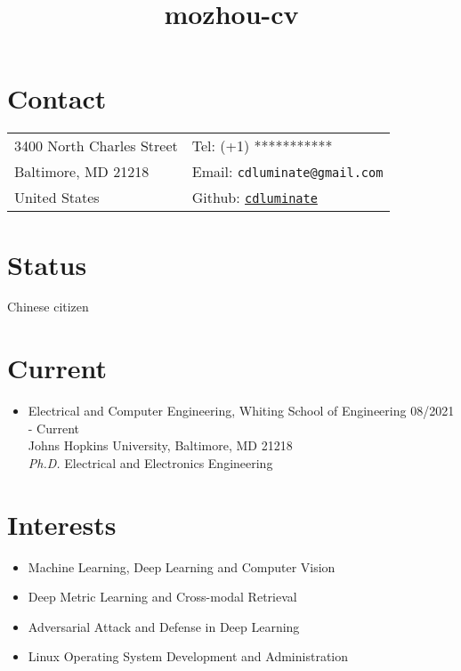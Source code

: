 \documentclass[10pt,margin,line,pifont,palatino,courier]{res}
\begin{document}
\title{mozhou-cv}
\begin{resume}

\section{\sc Contact}

\vspace{.05in}
\begin{tabular}{@{}p{2.2in}p{2.2in}}
3400 North Charles Street & Tel: (+1) *********** \\
Baltimore, MD 21218       & Email: \verb+cdluminate@gmail.com+\\
United States	          & Github: \href{https://github.com/cdluminate}{\tt cdluminate}
\end{tabular}

\section{\sc Status}
Chinese citizen

\section{\sc Current}

\begin{itemize}[leftmargin=*]
\item Electrical and Computer Engineering, Whiting School of Engineering
	\hfill 08/2021 - Current\\
	Johns Hopkins University, Baltimore, MD 21218\\
	\textit{Ph.D.} Electrical and Electronics Engineering
\end{itemize}

\section{\sc Interests}
\begin{itemize}[noitemsep, leftmargin=*]
	\item Machine Learning, Deep Learning and Computer Vision
	\item Deep Metric Learning and Cross-modal Retrieval
	\item Adversarial Attack and Defense in Deep Learning
	\item Linux Operating System Development and Administration
\end{itemize}
 

\end{resume}
\end{document}
